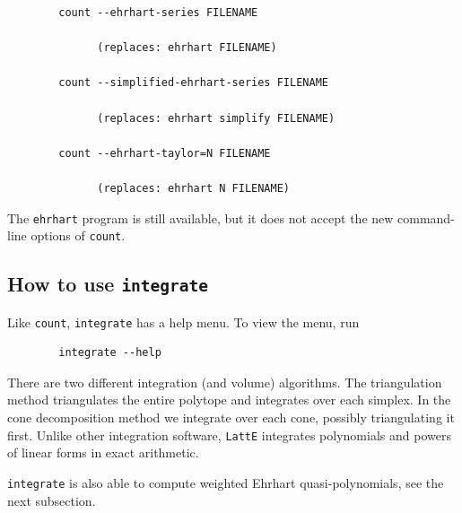 \documentclass{article}
\newcommand{\latte}{{\tt LattE}\xspace}
\begin{document}
\begin{verbatim} 
        count --ehrhart-series FILENAME
        
              (replaces: ehrhart FILENAME)

        count --simplified-ehrhart-series FILENAME

              (replaces: ehrhart simplify FILENAME)

        count --ehrhart-taylor=N FILENAME

              (replaces: ehrhart N FILENAME)
\end{verbatim}

The {\tt ehrhart} program is still available, but it does not accept
   the new command-line options of {\tt count}.

\subsection{How to use {\tt integrate}}

Like {\tt count}, {\tt integrate} has a help menu. To view the menu, run

\begin{verbatim}
        integrate --help
\end{verbatim}  

There are two different integration (and volume) algorithms. The triangulation method triangulates the entire polytope and integrates over each simplex. In the cone decomposition method we integrate over each cone, possibly triangulating it first. Unlike other integration software, \latte integrates polynomials and powers of linear forms in exact arithmetic.

{\tt integrate} is also able to compute weighted Ehrhart quasi-polynomials, see the next subsection.
\end{document}

